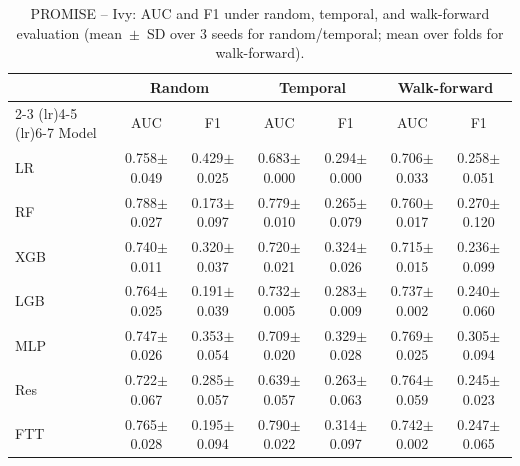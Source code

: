 \begin{table}[htbp]
\centering
\caption{PROMISE -- Ivy: AUC and F1 under random, temporal, and walk-forward evaluation (mean~$\pm$~SD over 3 seeds for random/temporal; mean over folds for walk-forward).}
\label{tab:supp-ivy}
\scriptsize
\begin{tabular}{l cc cc cc}
\toprule
 & \multicolumn{2}{c}{Random} & \multicolumn{2}{c}{Temporal} & \multicolumn{2}{c}{Walk-forward} \\
\cmidrule(lr){2-3} \cmidrule(lr){4-5} \cmidrule(lr){6-7}
Model & AUC & F1 & AUC & F1 & AUC & F1 \\
\midrule
LR & 0.758$\pm$0.049 & 0.429$\pm$0.025 & 0.683$\pm$0.000 & 0.294$\pm$0.000 & 0.706$\pm$0.033 & 0.258$\pm$0.051 \\
RF & 0.788$\pm$0.027 & 0.173$\pm$0.097 & 0.779$\pm$0.010 & 0.265$\pm$0.079 & 0.760$\pm$0.017 & 0.270$\pm$0.120 \\
XGB & 0.740$\pm$0.011 & 0.320$\pm$0.037 & 0.720$\pm$0.021 & 0.324$\pm$0.026 & 0.715$\pm$0.015 & 0.236$\pm$0.099 \\
LGB & 0.764$\pm$0.025 & 0.191$\pm$0.039 & 0.732$\pm$0.005 & 0.283$\pm$0.009 & 0.737$\pm$0.002 & 0.240$\pm$0.060 \\
MLP & 0.747$\pm$0.026 & 0.353$\pm$0.054 & 0.709$\pm$0.020 & 0.329$\pm$0.028 & 0.769$\pm$0.025 & 0.305$\pm$0.094 \\
Res & 0.722$\pm$0.067 & 0.285$\pm$0.057 & 0.639$\pm$0.057 & 0.263$\pm$0.063 & 0.764$\pm$0.059 & 0.245$\pm$0.023 \\
FTT & 0.765$\pm$0.028 & 0.195$\pm$0.094 & 0.790$\pm$0.022 & 0.314$\pm$0.097 & 0.742$\pm$0.002 & 0.247$\pm$0.065 \\
\bottomrule
\end{tabular}
\end{table}

